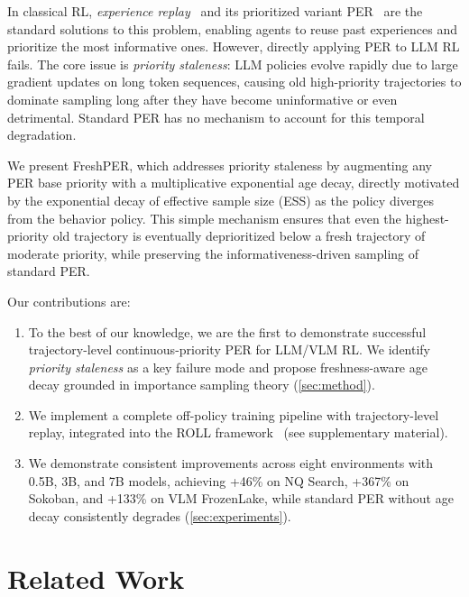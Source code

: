 \documentclass[runningheads]{llncs}
\newcommand{\method}{FreshPER}
\begin{document}
In classical RL, \emph{experience replay}~\cite{lin1992self,mnih2015human} and its prioritized variant PER~\cite{schaul2016per} are the standard solutions to this problem, enabling agents to reuse past experiences and prioritize the most informative ones. However, directly applying PER to LLM RL fails. The core issue is \emph{priority staleness}: LLM policies evolve rapidly due to large gradient updates on long token sequences, causing old high-priority trajectories to dominate sampling long after they have become uninformative or even detrimental. Standard PER has no mechanism to account for this temporal degradation.

We present \method{}, which addresses priority staleness by augmenting any PER base priority with a multiplicative exponential age decay, directly motivated by the exponential decay of effective sample size (ESS) as the policy diverges from the behavior policy. This simple mechanism ensures that even the highest-priority old trajectory is eventually deprioritized below a fresh trajectory of moderate priority, while preserving the informativeness-driven sampling of standard PER.

Our contributions are:
\begin{enumerate}
    \item To the best of our knowledge, we are the first to demonstrate successful trajectory-level continuous-priority PER for LLM/VLM RL. We identify \emph{priority staleness} as a key failure mode and propose freshness-aware age decay grounded in importance sampling theory (\cref{sec:method}).
    \item We implement a complete off-policy training pipeline with trajectory-level replay, integrated into the ROLL framework~\cite{wang2025roll} (see supplementary material).
    \item We demonstrate consistent improvements across eight environments with 0.5B, 3B, and 7B models, achieving +46\% on NQ Search, +367\% on Sokoban, and +133\% on VLM FrozenLake, while standard PER without age decay consistently degrades (\cref{sec:experiments}).
\end{enumerate}


\section{Related Work}
\label{sec:related}
\end{document}
